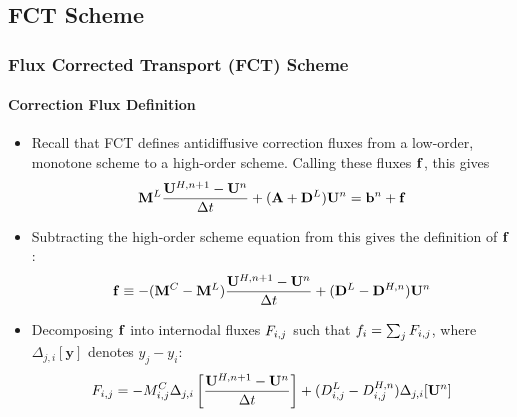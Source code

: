 \documentclass{beamer}
\begin{document}
\subsection{FCT Scheme}
\begin{frame}
\frametitle{Flux Corrected Transport (FCT) Scheme}
\framesubtitle{Correction Flux Definition}

\begin{itemize}
   \item Recall that FCT defines antidiffusive correction fluxes
      from a low-order, monotone scheme to a high-order scheme. Calling
      these fluxes $\mathbf{f}$, this gives
      \begin{equation}
         \mathbf{M}^L\frac{\mathbf{U}^{H,n+1}-\mathbf{U}^n}{\Delta t}+(\mathbf{A}+\mathbf{D}^L)\mathbf{U}^n = \mathbf{b}^n + \mathbf{f}
      \end{equation}
   \item Subtracting the high-order scheme equation from this gives the
      definition of $\mathbf{f}$:
      \begin{equation}
         \mathbf{f} \equiv -(\mathbf{M}^C-\mathbf{M}^L)\frac{\mathbf{U}^{H,n+1}-\mathbf{U}^n}{\Delta t} +(\mathbf{D}^L-\mathbf{D}^{H,n})\mathbf{U}^n
      \end{equation}
   \item Decomposing $\mathbf{f}$ into internodal fluxes
      $F_{i,j}$ such that $f_i = \sum_j F_{i,j}$, where $\Delta_{j,i}[\mathbf{y}]$
      denotes $y_j - y_i$:
   \begin{equation}
      F_{i,j} = -M_{i,j}^C\Delta_{j,i}\left[\frac{\mathbf{U}^{H,n+1}-\mathbf{U}^n}{\Delta t}\right]
      + (D_{i,j}^L-D_{i,j}^{H,n})\Delta_{j,i}[\mathbf{U}^n]
   \end{equation}
\end{itemize}

\end{frame}
\end{document}
